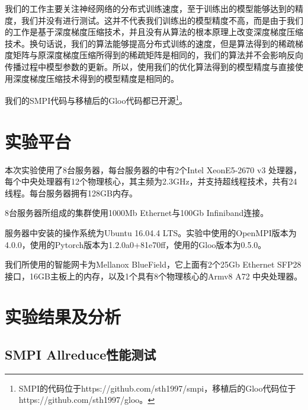 我们的工作主要关注神经网络的分布式训练速度，至于训练出的模型能够达到的精度，我们并没有进行测试。这并不代表我们训练出的模型精度不高，而是由于我们的工作是基于深度梯度压缩技术，并且没有从算法的根本原理上改变深度梯度压缩技术。换句话说，我们的算法能够提高分布式训练的速度，但是算法得到的稀疏梯度矩阵与原深度梯度压缩所得到的稀疏矩阵是相同的，我们的算法并不会影响反向传播过程中模型参数的更新。所以，使用我们的优化算法得到的模型精度与直接使用深度梯度压缩技术得到的模型精度是相同的。

我们的SMPI代码与移植后的Gloo代码都已开源\footnote{SMPI的代码位于https://github.com/sth1997/smpi，移植后的Gloo代码位于https://github.com/sth1997/gloo。}。

\section{实验平台}
本次实验使用了8台服务器，每台服务器的中有2个Intel XeonE5-2670 v3 处理器，每个中央处理器有12个物理核心，其主频为2.3GHz，并支持超线程技术，共有24线程。每台服务器拥有128GB内存。

8台服务器所组成的集群使用1000Mb Ethernet与100Gb Infiniband连接。

服务器中安装的操作系统为Ubuntu 16.04.4 LTS。实验中使用的OpenMPI版本为4.0.0，使用的Pytorch版本为1.2.0a0+81e70ff，使用的Gloo版本为0.5.0。

我们所使用的智能网卡为Mellanox BlueField，它上面有2个25Gb Ethernet SFP28 接口，16GB主板上的内存，以及1个具有8个物理核心的Armv8 A72 中央处理器。

\section{实验结果及分析}
\subsection{SMPI Allreduce性能测试}